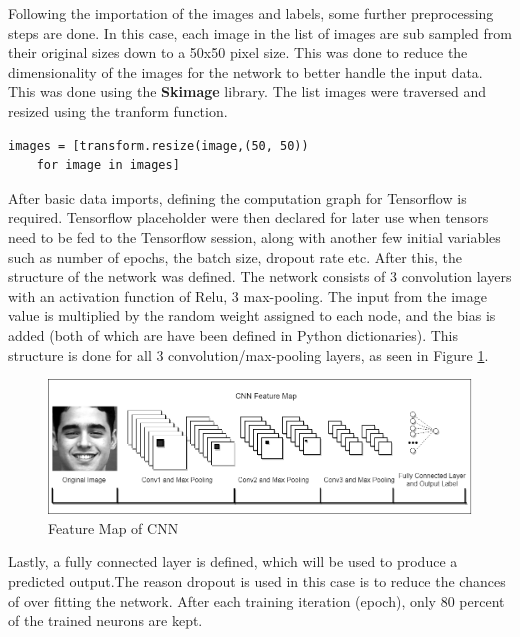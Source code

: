 Following the importation of the images and labels, some further preprocessing steps are done. In this case, each image in the list of images are sub sampled from their original sizes down to a 50x50 pixel size. This was done to reduce the dimensionality of the images for the network to better handle the input data. This was done using the \textbf{Skimage} library. The list images were traversed and resized using the tranform function. 
\begin{lstlisting}[frame=single]
images = [transform.resize(image,(50, 50))
	for image in images]
\end{lstlisting}
After basic data imports, defining the computation graph for Tensorflow is required.
Tensorflow placeholder were then declared for later use when tensors need to be fed to the Tensorflow session, along with another few initial variables such as number of epochs, the batch size, dropout rate etc.  After this, the structure of the network was defined. 
The network consists of 3 convolution layers with an activation function of Relu, 3 max-pooling. The input from the image value is multiplied by the random weight assigned to each node, and the bias is added (both of which are have been defined in Python dictionaries). This structure is done for all 3 convolution/max-pooling layers, as seen in Figure \ref{map}.

\begin{figure}[ht]
	\begin{center}
		\advance\leftskip-3cm
		\advance\rightskip-3cm
		\includegraphics[keepaspectratio=true,scale=0.5]{__resources/implementation/map.png}
		\caption{Feature Map of CNN}
		\label{map}
	\end{center}
\end{figure}
Lastly, a fully connected layer is defined, which will be used to produce a predicted output.The reason dropout is used in this case is to reduce the chances of over fitting the network. After each training iteration (epoch), only 80 percent of the trained neurons are kept.\\ \\



